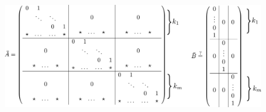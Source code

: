 \documentclass[ngerman]{tudscrreprt}
\begin{document}
\begin{figure}[H]
\centering
\def\svgwidth{200pt} 
  \includegraphics[width=16cm]{Amatrix.pdf}
\end{figure}
\end{document}
